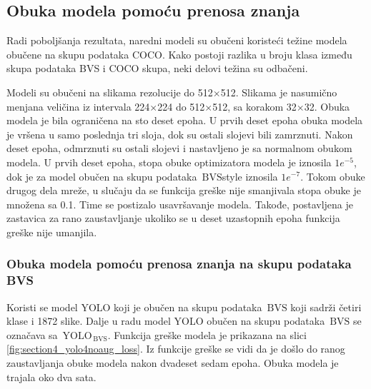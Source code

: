 \documentclass[12pt,oneside]{memoir}
\newcommand{\yolo}{\ensuremath{\,\textrm{YOLO}}}
\newcommand{\bvs}{\ensuremath{\,\textrm{BVS}}}
\begin{document}
\subsection{Obuka modela pomoću prenosa znanja}
Radi poboljšanja rezultata, naredni modeli su obučeni koristeći težine modela obučene na skupu podataka COCO. Kako postoji razlika u broju klasa između skupa podataka BVS i COCO skupa, neki delovi težina su odbačeni.

Modeli su obučeni na slikama rezolucije do 512$\times$512. Slikama je nasumično menjana veličina iz intervala 224$\times$224 do 512$\times$512, sa korakom 32$\times$32. Obuka modela je bila ograničena na sto deset epoha. U prvih deset epoha obuka modela je vršena u samo poslednja tri sloja, dok su ostali slojevi bili zamrznuti. Nakon deset epoha, odmrznuti su ostali slojevi i nastavljeno je sa normalnom obukom modela. U prvih deset epoha, stopa obuke optimizatora modela je iznosila $1e^{-5}$, dok je za model obučen na skupu podataka \bvs{style} iznosila $1e^{-7}$. Tokom obuke drugog dela mreže, u slučaju da se funkcija greške nije smanjivala stopa obuke je množena sa 0.1. Time se postizalo usavršavanje modela. Takođe, postavljena je zastavica za rano zaustavljanje ukoliko se u deset uzastopnih epoha funkcija greške nije umanjila.


\subsubsection{Obuka modela pomoću prenosa znanja na skupu podataka BVS}

%
%
Koristi se model YOLO koji je obučen na skupu podataka \bvs{} koji sadrži četiri klase i 1872 slike. Dalje u radu model YOLO obučen na skupu podataka \bvs{} se označava sa $\yolo_{\bvs}$. Funkcija greške modela je prikazana na slici \ref{fig:section4_yolo4noaug_loss}. Iz funkcije greške se vidi da je došlo do ranog zaustavljanja obuke modela nakon dvadeset sedam epoha. Obuka modela je trajala oko dva sata.
\end{document}
